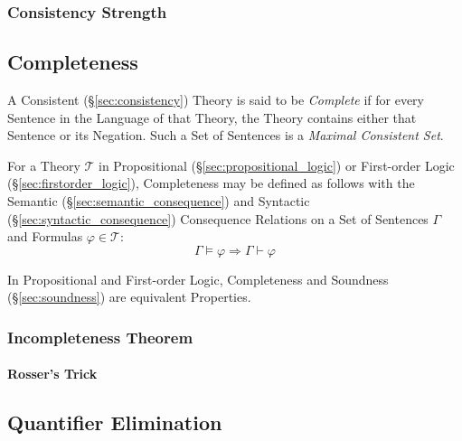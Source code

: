 \subsubsection{Consistency Strength}\label{sec:consistency_strength}



\subsection{Completeness}\label{sec:completeness}

A Consistent (\S\ref{sec:consistency}) Theory is said to be
\emph{Complete} if for every Sentence in the Language of that Theory,
the Theory contains either that Sentence or its Negation. Such a Set
of Sentences is a \emph{Maximal Consistent Set}.

For a Theory $\mathcal{T}$ in Propositional
(\S\ref{sec:propositional_logic}) or First-order Logic
(\S\ref{sec:firstorder_logic}), Completeness may be defined as follows
with the Semantic (\S\ref{sec:semantic_consequence}) and Syntactic
(\S\ref{sec:syntactic_consequence}) Consequence Relations on a Set of
Sentences $\Gamma$ and Formulas $\varphi \in \mathcal{T}$:
\[
  \Gamma \vDash \varphi \Rightarrow \Gamma \vdash \varphi
\]

In Propositional and First-order Logic, Completeness and Soundness
(\S\ref{sec:soundness}) are equivalent Properties.



\subsubsection{Incompleteness Theorem}\label{sec:incompleteness_theorem}

\paragraph{Rosser's Trick}\label{sec:rossers_trick}



\subsection{Quantifier Elimination}\label{sec:quantifier_elimination}

